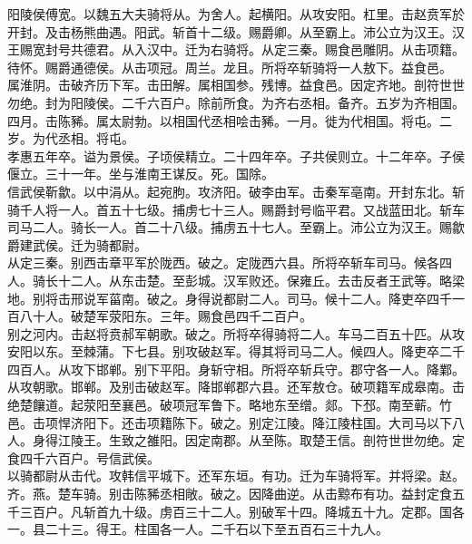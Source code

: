 \documentclass{zhvt-classic}
\begin{document}

\hspace*{2em}阳陵侯傅宽。以魏五大夫骑将从。为舍人。起横阳。从攻安阳。杠里。击赵贲军於开封。及击杨熊曲遇。阳武。斩首十二级。赐爵卿。从至霸上。沛公立为汉王。汉王赐宽封号共德君。从入汉中。迁为右骑将。从定三秦。赐食邑雕阴。从击项籍。待怀。赐爵通德侯。从击项冠。周兰。龙且。所将卒斩骑将一人敖下。益食邑。\\
\hspace*{2em}属淮阴。击破齐历下军。击田解。属相国参。残博。益食邑。因定齐地。剖符世世勿绝。封为阳陵侯。二千六百户。除前所食。为齐右丞相。备齐。五岁为齐相国。\\
\hspace*{2em}四月。击陈豨。属太尉勃。以相国代丞相哙击豨。一月。徙为代相国。将屯。二岁。为代丞相。将屯。\\
\hspace*{2em}孝惠五年卒。谥为景侯。子顷侯精立。二十四年卒。子共侯则立。十二年卒。子侯偃立。三十一年。坐与淮南王谋反。死。国除。\\
\hspace*{2em}信武侯靳歙。以中涓从。起宛朐。攻济阳。破李由军。击秦军亳南。开封东北。斩骑千人将一人。首五十七级。捕虏七十三人。赐爵封号临平君。又战蓝田北。斩车司马二人。骑长一人。首二十八级。捕虏五十七人。至霸上。沛公立为汉王。赐歙爵建武侯。迁为骑都尉。\\
\hspace*{2em}从定三秦。别西击章平军於陇西。破之。定陇西六县。所将卒斩车司马。候各四人。骑长十二人。从东击楚。至彭城。汉军败还。保雍丘。去击反者王武等。略梁地。别将击邢说军菑南。破之。身得说都尉二人。司马。候十二人。降吏卒四千一百八十人。破楚军荥阳东。三年。赐食邑四千二百户。\\
\hspace*{2em}别之河内。击赵将贲郝军朝歌。破之。所将卒得骑将二人。车马二百五十匹。从攻安阳以东。至棘蒲。下七县。别攻破赵军。得其将司马二人。候四人。降吏卒二千四百人。从攻下邯郸。别下平阳。身斩守相。所将卒斩兵守。郡守各一人。降鄴。从攻朝歌。邯郸。及别击破赵军。降邯郸郡六县。还军敖仓。破项籍军成皋南。击绝楚饟道。起荥阳至襄邑。破项冠军鲁下。略地东至缯。郯。下邳。南至蕲。竹邑。击项悍济阳下。还击项籍陈下。破之。别定江陵。降江陵柱国。大司马以下八人。身得江陵王。生致之雒阳。因定南郡。从至陈。取楚王信。剖符世世勿绝。定食四千六百户。号信武侯。\\
\hspace*{2em}以骑都尉从击代。攻韩信平城下。还军东垣。有功。迁为车骑将军。并将梁。赵。齐。燕。楚车骑。别击陈豨丞相敞。破之。因降曲逆。从击黥布有功。益封定食五千三百户。凡斩首九十级。虏百三十二人。别破军十四。降城五十九。定郡。国各一。县二十三。得王。柱国各一人。二千石以下至五百石三十九人。\\
\end{document}
